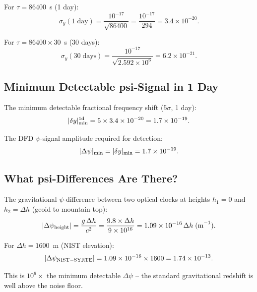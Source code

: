 \documentclass[aps,prd,twocolumn,superscriptaddress,nofootinbib]{revtex4-2}
\begin{document}
For $\tau = 86400$~s (1 day):
\begin{equation}
\sigma_y(1\;\text{day}) = \frac{10^{-17}}{\sqrt{86400}}
= \frac{10^{-17}}{294} = 3.4\times10^{-20}.
\label{eq:optical_day}
\end{equation}

For $\tau = 86400\times30$~s (30 days):
\begin{equation}
\sigma_y(30\;\text{days}) = \frac{10^{-17}}{\sqrt{2.592\times10^6}}
= 6.2\times10^{-21}.
\label{eq:optical_month}
\end{equation}

\subsection{Minimum Detectable psi-Signal in 1 Day}

The minimum detectable fractional frequency shift ($5\sigma$, 1 day):
\begin{equation}
|\delta y|_{\rm min}^{1\rm d} = 5\times3.4\times10^{-20}
= 1.7\times10^{-19}.
\label{eq:optical_min}
\end{equation}

The DFD $\psi$-signal amplitude required for detection:
\begin{equation}
|\Delta\psi|_{\rm min} = |\delta y|_{\rm min} = 1.7\times10^{-19}.
\label{eq:psi_min}
\end{equation}

\subsection{What psi-Differences Are There?}

The gravitational $\psi$-difference between two optical clocks at heights
$h_1 = 0$ and $h_2 = \Delta h$ (geoid to mountain top):
\begin{equation}
|\Delta\psi_{\rm height}| = \frac{g\,\Delta h}{c^2}
= \frac{9.8\times\Delta h}{9\times10^{16}}
= 1.09\times10^{-16}\,\Delta h\;\text{(m}^{-1}\text{)}.
\end{equation}

For $\Delta h = 1600$~m (NIST elevation):
\begin{equation}
|\Delta\psi_{\rm NIST-SYRTE}| = 1.09\times10^{-16}\times1600
= 1.74\times10^{-13}.
\end{equation}

This is $10^6\times$ the minimum detectable $\Delta\psi$ -- the
standard gravitational redshift is well above the noise floor.
\end{document}
